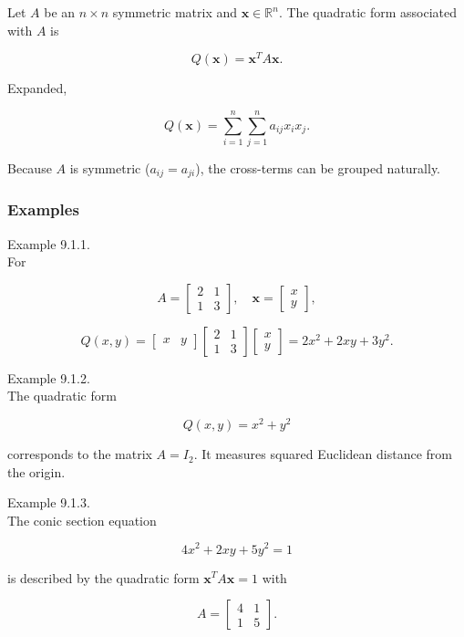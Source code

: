 \documentclass[
  12pt,
  a4paper,
]{article}
\begin{document}
Let \(A\) be an \(n \times n\) symmetric matrix and
\(\mathbf{x} \in \mathbb{R}^n\). The quadratic form associated with
\(A\) is

\[Q(\mathbf{x}) = \mathbf{x}^T A \mathbf{x}.\]

Expanded,

\[Q(\mathbf{x}) = \sum_{i=1}^n \sum_{j=1}^n a_{ij} x_i x_j.\]

Because \(A\) is symmetric (\(a_{ij} = a_{ji}\)), the cross-terms can be
grouped naturally.

\subsubsection{Examples}\label{examples-9}

Example 9.1.1.\\
For

\[A = \begin{bmatrix} 2 & 1 \\ 1 & 3 \end{bmatrix}, \quad \mathbf{x} = \begin{bmatrix} x \\ y \end{bmatrix},\]

\[Q(x,y) = \begin{bmatrix} x & y \end{bmatrix} 
\begin{bmatrix} 2 & 1 \\ 1 & 3 \end{bmatrix} 
\begin{bmatrix} x \\ y \end{bmatrix}
= 2x^2 + 2xy + 3y^2.\]

Example 9.1.2.\\
The quadratic form

\[Q(x,y) = x^2 + y^2\]

corresponds to the matrix \(A = I_2\). It measures squared Euclidean
distance from the origin.

Example 9.1.3.\\
The conic section equation

\[4x^2 + 2xy + 5y^2 = 1\]

is described by the quadratic form \(\mathbf{x}^T A \mathbf{x} = 1\)
with

\[A = \begin{bmatrix} 4 & 1 \\ 1 & 5 \end{bmatrix}.\]
\end{document}
